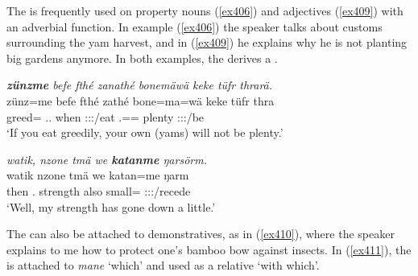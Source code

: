 The   is frequently used on property nouns (\ref{ex406}) and adjectives (\ref{ex409}) with an adverbial function. In example (\ref{ex406}) the speaker talks about customs surrounding the yam harvest, and in (\ref{ex409}) he explains why he is not planting big gardens anymore. In both examples, the   derives a .  

\begin{exe}
	\ex \emph{\textbf{zünzme} befe fthé zanathé bonemäwä keke tüfr thrarä.}\\
	\gll zünz=me befe fthé zathé bone=ma=wä keke tüfr thra\\
	greed={\Ins} \Ssg.\Erg.{\Emph} when \Ssg:\Sbj:\Imp:\Pfv/eat \Ssg.\Poss=\Char={\Emph} {\Neg} plenty \Stpl:\Sbj:\Irr:\Ipfv/be\\
	\trans `If you eat greedily, your own (yams) will not be plenty.'
	\label{ex406}
\end{exe}
\begin{exe}
	\ex \emph{watik, nzone tmä we \textbf{katanme} ŋarsörm.}\\
	\gll watik nzone tmä we katan=me ŋarm\\
	then \Fsg.{\Poss} strength also small={\Ins} \Stsg:\Sbj:\Rpst:\Dur/recede\\
	\trans `Well, my strength has gone down a little.'
	\label{ex409}
\end{exe}
	
The   can also be attached to demonstratives, as in (\ref{ex410}), where the speaker explains to me how to protect one's bamboo bow against insects. In (\ref{ex411}), the  is attached to \emph{mane} `which' and used as a relative  `with which'.

